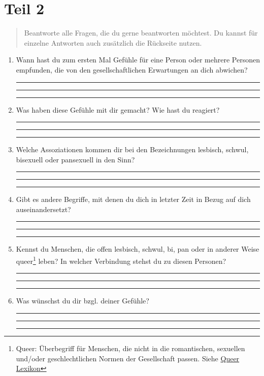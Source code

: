 \documentclass[a4paper,12pt]{article}
\begin{document}
\section*{Teil 2}

\begin{quote}
Beantworte alle Fragen, die du gerne beantworten möchtest. Du kannst für einzelne Antworten auch zusätzlich die Rückseite nutzen.
\end{quote}

\begin{enumerate}[label=--]
    \item Wann hast du zum ersten Mal Gefühle für eine Person oder mehrere Personen empfunden, die von den gesellschaftlichen Erwartungen an dich abwichen?  

    \rule{12cm}{0.2pt}

    \rule{12cm}{0.2pt}

    \rule{12cm}{0.2pt}
    
    \item Was haben diese Gefühle mit dir gemacht? Wie hast du reagiert?  

    \rule{12cm}{0.2pt}

    \rule{12cm}{0.2pt}
    
    \rule{12cm}{0.2pt}
    
    \item Welche Assoziationen kommen dir bei den Bezeichnungen lesbisch, schwul, bisexuell oder pansexuell in den Sinn?  

    \rule{12cm}{0.2pt}

    \rule{12cm}{0.2pt}
    
    \rule{12cm}{0.2pt}
    
    \item Gibt es andere Begriffe, mit denen du dich in letzter Zeit in Bezug auf dich auseinandersetzt?  

    \rule{12cm}{0.2pt}

    \rule{12cm}{0.2pt}
    
    \rule{12cm}{0.2pt}
    
    \item Kennst du Menschen, die offen lesbisch, schwul, bi, pan oder in anderer Weise queer\footnote{Queer: Überbegriff für Menschen, die nicht in die romantischen, sexuellen und/oder geschlechtlichen Normen der Gesellschaft passen. Siehe \href{https://queer-lexikon.net/2017/06/08/queer/}{Queer Lexikon}} leben? In welcher Verbindung stehst du zu diesen Personen?  

    \rule{12cm}{0.2pt}

    \rule{12cm}{0.2pt}
    
    \rule{12cm}{0.2pt}
    
    \item Was wünschst du dir bzgl. deiner Gefühle?  

    \rule{12cm}{0.2pt}

    \rule{12cm}{0.2pt}
    
    \rule{12cm}{0.2pt}
\end{enumerate}
\end{document}
